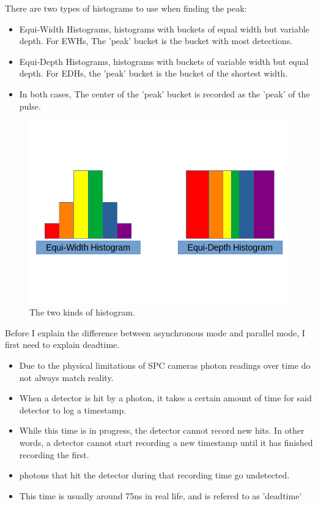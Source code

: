 \documentclass{beamer}
\begin{document}
\begin{frame}  
  There are two types of histograms to use when finding the peak: \cite{sadekar}
  \begin{itemize}
  \item Equi-Width Histograms, histograms with buckets of equal width but variable depth. For EWHs, The 'peak' bucket is the bucket with most detections.
  \item Equi-Depth Histograms, histograms with buckets of variable width but equal depth. For EDHs, the 'peak' bucket is the bucket of the shortest width.
  \item In both cases, The center of the 'peak' bucket is recorded as the 'peak' of the pulse.
  \end{itemize}
\end{frame}

\begin{frame}
  \begin{figure}[H]
    \centering
    \includegraphics[width=1\linewidth]{Histograms.png}
    \caption{\label{fig:Data}The two kinds of histogram.}
  \end{figure}
\end{frame}

\begin{frame}
  Before I explain the difference between asynchronous mode and parallel mode, I first need to explain deadtime.
  \begin{itemize}
  \item Due to the physical limitations of SPC cameras photon readings over time do not always match reality.
  \item When a detector is hit by a photon, it takes a certain amount of time for said detector to log a timestamp.
  \item While this time is in progress, the detector cannot record new hits. In other words, a detector cannot start recording a new timestamp until it has finished recording the first.
  \item photons that hit the detector during that recording time go undetected.
  \item This time is usually around 75ns in real life, and is refered to as 'deadtime' \cite{sadekar}
  \end{itemize}
\end{frame}
\end{document}
